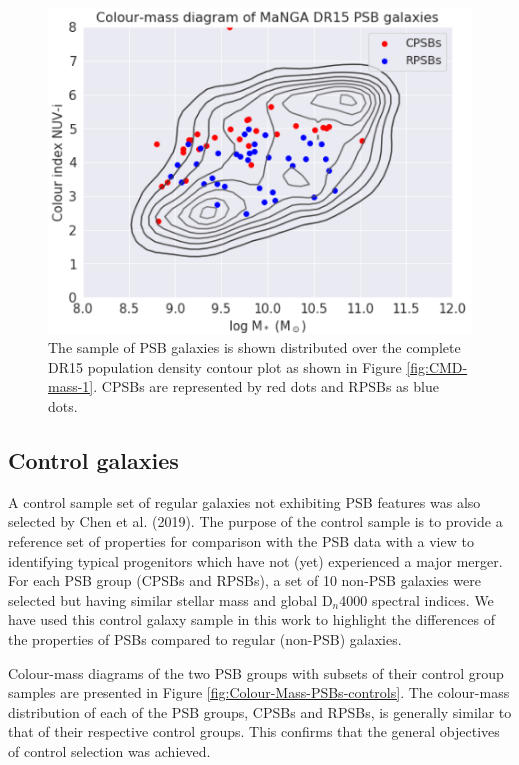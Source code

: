 \begin{figure}
    \centering
    \includegraphics[width=\columnwidth]{images/CMDs/CMD-CPSB+RPSB-15.png}
    \caption[Colour-mass distribution of PSBs]{The sample of PSB galaxies is shown distributed over the complete DR15 population density contour plot as shown in Figure \ref{fig:CMD-mass-1}. CPSBs are represented by red dots and RPSBs as blue dots.}
    \label{fig:Colour-Mass-PSBs}
\end{figure}

\subsection{Control galaxies}
\label{sec:controls}
A control sample set of regular galaxies not exhibiting PSB features was also selected by Chen et al. (2019). The purpose of the control sample is to provide a reference set of properties for comparison with the PSB data with a view to identifying typical progenitors which have not (yet) experienced a major merger. For each PSB group (CPSBs and RPSBs), a set of 10 non-PSB galaxies were selected but having similar stellar mass and global D$_n$4000 spectral indices. We have used this control galaxy sample in this work to highlight the differences of the properties of PSBs compared to regular (non-PSB) galaxies.

Colour-mass diagrams of the two PSB groups with subsets of their control group samples are presented in Figure \ref{fig:Colour-Mass-PSBs-controls}. The colour-mass distribution of each of the PSB groups, CPSBs and RPSBs, is generally similar to that of their respective control groups. This confirms that the general objectives of control selection was achieved.

